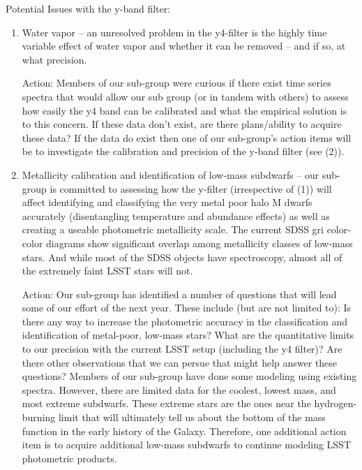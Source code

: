 Potential Issues with the y-band filter: 
\begin{enumerate}
\item{Water vapor – an unresolved problem in the y4-filter is the highly time variable effect of water vapor 
and whether it can be removed – and if so, at what precision. 

Action: Members of our sub-group were curious if there exist time series spectra that would allow our sub group (or in tandem with others) to assess how easily the y4 band can be calibrated and what the empirical solution is to this concern. If these data don't exist, are there plans/ability to acquire these data? 
If the data do exist then one of our sub-group’s action items will be to investigate the calibration and precision of the y-band filter (see (2)). }

\item{Metallicity calibration and identification of low-mass subdwarfs – our sub-group is committed to 
assessing how the y-filter (irrespective of (1)) will affect identifying and classifying the very 
metal poor halo M dwarfs accurately (disentangling temperature and abundance effects) as well as creating a useable photometric metallicity scale. The current SDSS gri color-color diagrams show significant overlap among metallicity classes of low-mass stars. And while most of the SDSS objects have spectroscopy, almost all of the extremely faint LSST stars will not. 

Action: Our sub-group has identified a number of questions that will lead some of our effort of the next year. These include (but are not limited to): Is there any way to increase the photometric accuracy in the classification and identification of metal-poor, low-mass stars? What are the quantitative limits to our precision with the current LSST setup (including the y4 filter)? Are there other observations that we can persue that might help answer these questions? Members of our sub-group have done some modeling using existing spectra. However, there are limited data for the coolest, lowest mass, and most extreme subdwarfs. These extreme stars are the ones near the hydrogen-burning limit that will ultimately tell us about the bottom of the mass function in the early history of the Galaxy. 
Therefore, one additional action item is to acquire additional low-mass subdwarfs to continue modeling LSST photometric products. }
\end{enumerate}

